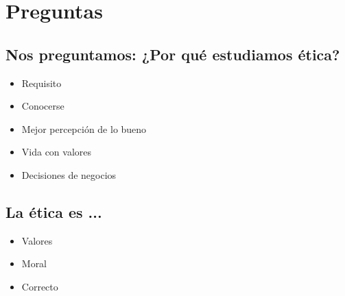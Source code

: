 \section{Preguntas}
\subsection{\textbf{Nos preguntamos:} ¿Por qué estudiamos ética?}
\begin{itemize}
    \item Requisito 
    \item Conocerse 
    \item Mejor percepción de lo bueno 
    \item Vida con valores 
    \item Decisiones de negocios  
\end{itemize}

\subsection*{La ética es ... }
\begin{itemize}
    \item Valores 
    \item Moral 
    \item Correcto 
\end{itemize}

